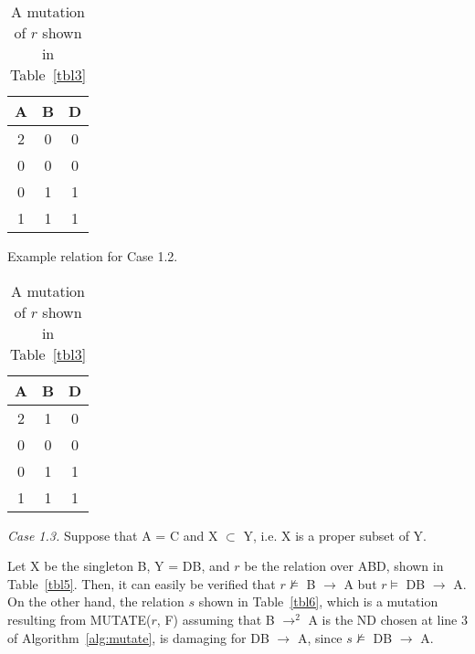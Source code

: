 {\line
\begin{table}[ht]
\begin{minipage}[b]{7cm}
\begin{center}
\begin{tabular}{|c|c|c|} \hline
A & B & D \\ \hline
2 & 0 & 0 \\
0 & 0 & 0 \\
0 & 1 & 1 \\ 
1 & 1 & 1 \\ \hline
\end{tabular}
\end{center}
\caption{\label{tbl3} Example relation for Case 1.2.} 
\end{minipage}
\hfill
\begin{minipage}[b]{7cm}
\begin{center}
\begin{tabular}{|c|c|c|} \hline
A & B & D \\ \hline
2 & 1 & 0 \\
0 & 0 & 0 \\
0 & 1 & 1 \\ 
1 & 1 & 1 \\ \hline
\end{tabular}
\end{center}
\caption{\label{tbl4} A mutation of $r$ shown in Table~\ref{tbl3}} 
\end{minipage}
\end{table}
}
{\em Case 1.3.}
Suppose that A = C and X $\subset$ Y, i.e. X is a proper subset of Y.

Let X be the singleton B, Y = DB,
and $r$ be the relation over ABD, shown in Table~\ref{tbl5}.
Then, it can easily be verified that 
$r \not\models$ B $\to$ A but $r \models$ DB $\to$ A.
On the other hand, the relation $s$ shown in Table~\ref{tbl6},
which is a mutation resulting from MUTATE($r$, F) assuming that 
B $\to^2$ A is the ND chosen at line 3 of Algorithm~\ref{alg:mutate},
is damaging for DB $\to$ A, since $s \not\models$ DB $\to$ A.

